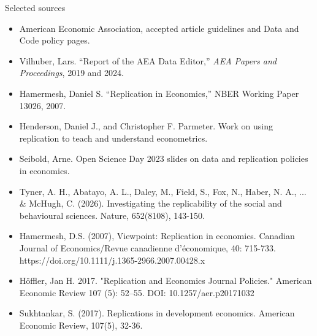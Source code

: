 \documentclass[11.5pt,aspectratio=169]{beamer}
\begin{document}
{\begin{frame}[t]{Selected sources}
\footnotesize
\begin{itemize}\setlength{\itemsep}{0.45em}
\scriptsize
  \item American Economic Association, accepted article guidelines and Data and Code policy pages.
  \item Vilhuber, Lars. ``Report of the AEA Data Editor,'' \emph{AEA Papers and Proceedings}, 2019 and 2024.
  \item Hamermesh, Daniel S. ``Replication in Economics,'' NBER Working Paper 13026, 2007.
  \item Henderson, Daniel J., and Christopher F. Parmeter. Work on using replication to teach and understand econometrics.
  \item Seibold, Arne. Open Science Day 2023 slides on data and replication policies in economics.
  \item Tyner, A. H., Abatayo, A. L., Daley, M., Field, S., Fox, N., Haber, N. A., ... & McHugh, C. (2026). Investigating the replicability of the social and behavioural sciences. Nature, 652(8108), 143-150.
  \item Hamermesh, D.S. (2007), Viewpoint: Replication in economics. Canadian Journal of Economics/Revue canadienne d'économique, 40: 715-733. https://doi.org/10.1111/j.1365-2966.2007.00428.x
  \item Höffler, Jan H. 2017. "Replication and Economics Journal Policies." American Economic Review 107 (5): 52–55.
  DOI: 10.1257/aer.p20171032
  \item Sukhtankar, S. (2017). Replications in development economics. American Economic Review, 107(5), 32-36.
\end{itemize}
\end{frame}

}
\end{document}
